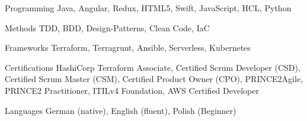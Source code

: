 

\begin{cvskills}

  \cvskill
    {Programming} %
    {Java, Angular, Redux, HTML5, Swift, JavaScript, HCL, Python} %

  \cvskill
    {Methods} %
    {TDD, BDD, Design-Patterns, Clean Code, IaC} %

  \cvskill
    {Frameworks} %
    {Terraform, Terragrunt, Ansible, Serverless, Kubernetes} %

\cvskill
{Certifications} %
{HashiCorp Terraform Associate, Certified Scrum Developer (CSD), Certified Scrum Master (CSM), Certified Product Owner (CPO), PRINCE2Agile, PRINCE2 Practitioner, ITILv4 Foundation, AWS Certified Developer} %

  \cvskill
    {Languages} %
    {German (native), English (fluent), Polish (Beginner)} %


\end{cvskills}
